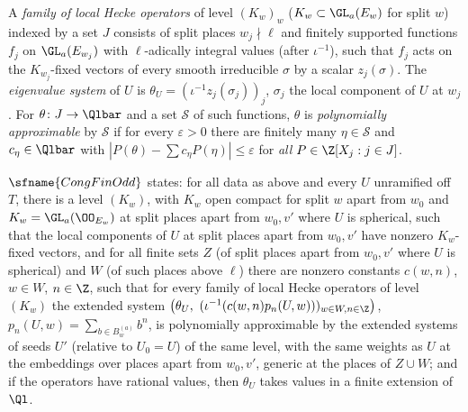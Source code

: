 \begin{definition}\label{pf:galred:congdef}
A \emph{family of local Hecke operators} of level $(K_w)_w$ ($K_w\subset\GL_a(E_w)$ for split $w$) indexed by a set $J$
consists of split places $w_j\nmid\ell$ and finitely supported functions $f_j$ on $\GL_a(E_{w_j})$ with $\ell$-adically
integral values (after $\iota^{-1}$), such that $f_j$ acts on the $K_{w_j}$-fixed vectors of every smooth irreducible
$\sigma$ by a scalar $z_j(\sigma)$. The \emph{eigenvalue system} of $U$ is $\theta_U=(\iota^{-1}z_j(\sigma_j))_j$, $\sigma_j$ the
local component of $U$ at $w_j$. For $\theta\colon J\to\Qlbar$ and a set $\mathcal S$ of such functions, $\theta$ is
\emph{polynomially approximable} by $\mathcal S$ if for every $\varepsilon>0$ there are finitely many
$\eta\in\mathcal S$ and $c_\eta\in\Qlbar$ with $|P(\theta)-\sum c_\eta P(\eta)|\le\varepsilon$ for \emph{all}
$P\in\Z[X_j:j\in J]$.

$\sfname{CongFinOdd}$ states: for all data as above and every $U$ unramified off $T$, there is a level $(K_w)$, with
$K_w$ open compact for split $w$ apart from $w_0$ and $K_w=\GL_a(\OO_{E_w})$ at split places apart from $w_0,v'$ where
$U$ is spherical, such that the local components of $U$ at split places apart from $w_0,v'$ have nonzero
$K_w$-fixed vectors, and for all finite sets $Z$ (of split places apart from $w_0,v'$ where $U$ is spherical) and $W$
(of such places above $\ell$) there are nonzero constants $c(w,n)$, $w\in W$, $n\in\Z$, such that for every family of
local Hecke operators of level $(K_w)$ the extended system
$\bigl(\theta_U,\ (\iota^{-1}(c(w,n)p_n(U,w)))_{w\in W,n\in\Z}\bigr)$, $p_n(U,w)=\sum_{b\in B^{(a)}_w}b^n$, is
polynomially approximable by the extended systems of seeds $U'$ (relative to $U_0=U$) of the same level, with the same
weights as $U$ at the embeddings over places apart from $w_0,v'$, generic at the places of $Z\cup W$; and if the
operators have rational values, then $\theta_U$ takes values in a finite extension of $\Ql$.
\end{definition}

